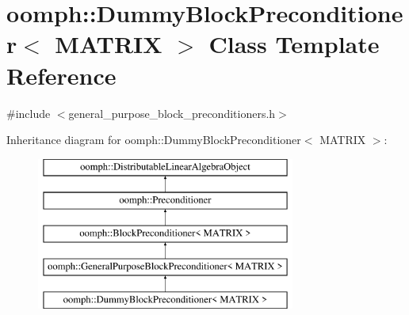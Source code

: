 \hypertarget{classoomph_1_1DummyBlockPreconditioner}{}\section{oomph\+:\+:Dummy\+Block\+Preconditioner$<$ M\+A\+T\+R\+IX $>$ Class Template Reference}
\label{classoomph_1_1DummyBlockPreconditioner}


{\ttfamily \#include $<$general\+\_\+purpose\+\_\+block\+\_\+preconditioners.\+h$>$}

Inheritance diagram for oomph\+:\+:Dummy\+Block\+Preconditioner$<$ M\+A\+T\+R\+IX $>$\+:\begin{figure}[H]
\begin{center}
\leavevmode
\includegraphics[height=5.000000cm]{classoomph_1_1DummyBlockPreconditioner}
\end{center}
\end{figure}
